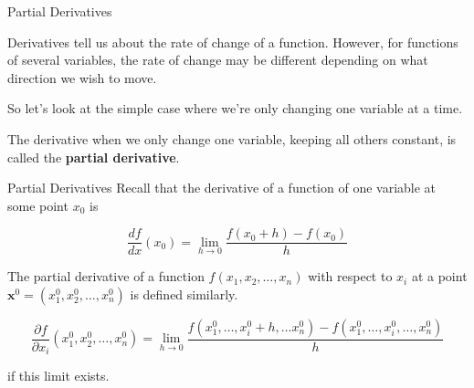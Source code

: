 \documentclass[11pt, xcolor={dvipsnames}, hyperref={colorlinks, allcolors=Blue}]{beamer}
\newcommand\bc[1]{{\usebeamercolor[fg]{frametitle} {\textbf{#1}}}} %
\newcommand{\x}{\mathbf{x}}
\begin{document}
\begin{frame}{Partial Derivatives}

Derivatives tell us about the rate of change of a function. However, for functions of several variables, the rate of change may be different depending on what direction we wish to move.\bigskip

So let's look at the simple case where we're only changing one variable at a time. \bigskip 

The derivative when we only change one variable, keeping all others constant, is called the \bc{partial derivative}.  \bigskip
\end{frame}

\begin{frame}{Partial Derivatives}
Recall that the derivative of a function of one variable at some point $x_{0}$ is 

\[ \frac{df}{dx}(x_{0}) = \lim_{h\to 0} \frac{f(x_{0}+h) - f(x_{0})}{h} \]

\bigskip

The partial derivative of a function $f(x_{1}, x_{2},\dots,x_{n})$ with respect to $x_{i}$ at a point $\x^{0} = (x_{1}^{0}, x_{2}^{0},\dots,x_{n}^{0})$ is defined similarly.\bigskip



\[ \frac{\partial f}{\partial x_{i}} (x_{1}^{0}, x_{2}^{0},\dots,x_{n}^{0}) = \lim_{h\to 0} \frac{f(x_{1}^{0},\dots, x_{i}^{0} + h,\dots x_{n}^{0}) - f(x_{1}^{0},\dots, x_{i}^{0},\dots,x_{n}^{0})}{h}\]

\smallskip
if this limit exists.
\end{frame}
\end{document}
